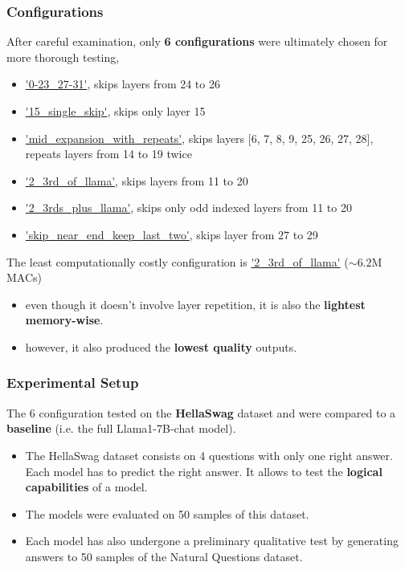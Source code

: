 \documentclass{beamer}
\begin{document}
\begin{frame}
  \frametitle{Configurations}
  After careful examination, only \textbf{6 configurations} were ultimately chosen for more thorough testing,
  \begin{itemize}
    \item \url{'0-23\_27-31'}, skips layers from 24 to 26
    \item \url{'15\_single\_skip'}, skips only layer 15
    \item \url{'mid\_expansion\_with\_repeats'}, skips layers [6, 7, 8, 9, 25, 26, 27, 28], repeats layers from 14 to 19 twice
    \item \url{'2\_3rd\_of\_llama'}, skips layers from 11 to 20
    \item \url{'2\_3rds\_plus\_llama'}, skips only odd indexed layers from 11 to 20
    \item \url{'skip\_near\_end\_keep\_last\_two'}, skips layer from 27 to 29
  \end{itemize}
  The least computationally costly configuration is \url{'2\_3rd\_of\_llama'} ($\sim 6.2$M MACs)
  \begin{itemize}
    \item even though it doesn't involve layer repetition, it is also the \textbf{lightest memory-wise}.
    \item however, it also produced the \textbf{lowest quality} outputs.
  \end{itemize}
  \end{frame}

\begin{frame}
  \frametitle{Experimental Setup}
  The 6 configuration tested on the \textbf{HellaSwag} dataset and were compared
  to a \textbf{baseline} (i.e. the full Llama1-7B-chat model).
  \begin{itemize}
    \item The HellaSwag dataset consists on 4 questions with only one right answer. Each model has to predict the right answer. It allows to test the \textbf{logical capabilities} of a model.
    \item The models were evaluated on 50 samples of this dataset.
    \item Each model has also undergone a preliminary qualitative test by generating answers to 50 samples of the Natural Questions dataset.
  \end{itemize}
\end{frame}
\end{document}
